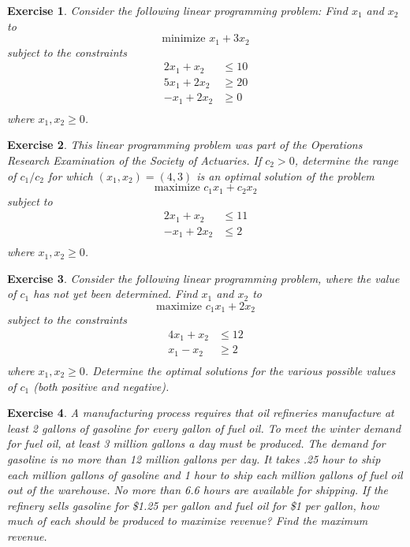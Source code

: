 \documentclass[letterpaper,10pt]{article}
\newtheorem{ex}{Exercise}
\begin{document}
\begin{ex}
Consider the following linear programming problem:  Find $x_1$ and $x_2$ to $$\text{minimize }x_1+3x_2$$ subject to the constraints \begin{eqnarray*}
2x_1+x_2&\leq 10\\
5x_1+2x_2&\geq 20\\
-x_1+2x_2&\geq 0\\
\end{eqnarray*}
where $x_1,x_2\geq 0$.
\end{ex}


\begin{ex}
This linear programming problem was part of the Operations Research Examination of the {\em Society of Actuaries}.  If $c_2>0$, determine the range of $c_1/c_2$ for which $(x_1,x_2)=(4,3)$ is an optimal solution of the problem $$\text{maximize }c_1x_1+c_2x_2$$ subject to
\begin{eqnarray*}
2x_1+x_2&\leq 11\\
-x_1+2x_2&\leq 2\\
\end{eqnarray*}
where $x_1,x_2\geq 0$.

\end{ex}



\begin{ex}
Consider the following linear programming problem, where the value of $c_1$ has not yet been determined.  Find $x_1$ and $x_2$ to $$\text{maximize } c_1x_1+2x_2$$ subject to the constraints 
\begin{eqnarray*}
4x_1+x_2&\leq 12\\
x_1-x_2&\geq 2\\
\end{eqnarray*}
where $x_1,x_2\geq 0$.  Determine the optimal solutions for the various possible values of $c_1$ (both positive and negative).

\end{ex}


\begin{ex}	
A manufacturing process requires that oil refineries manufacture at least 2 gallons of gasoline for every gallon of fuel oil. To meet the winter demand for fuel oil, at least 3 million gallons a day must be produced. The demand for gasoline is no more than 12 million gallons per day. It takes .25 hour to ship each million gallons of gasoline and 1 hour to ship each million gallons of fuel oil out of the warehouse. No more than 6.6 hours are available for shipping. If the refinery sells gasoline for \$1.25 per gallon and fuel oil for \$1 per gallon, how much of each should be produced to maximize revenue? Find the maximum revenue.



\end{ex}
\end{document}
